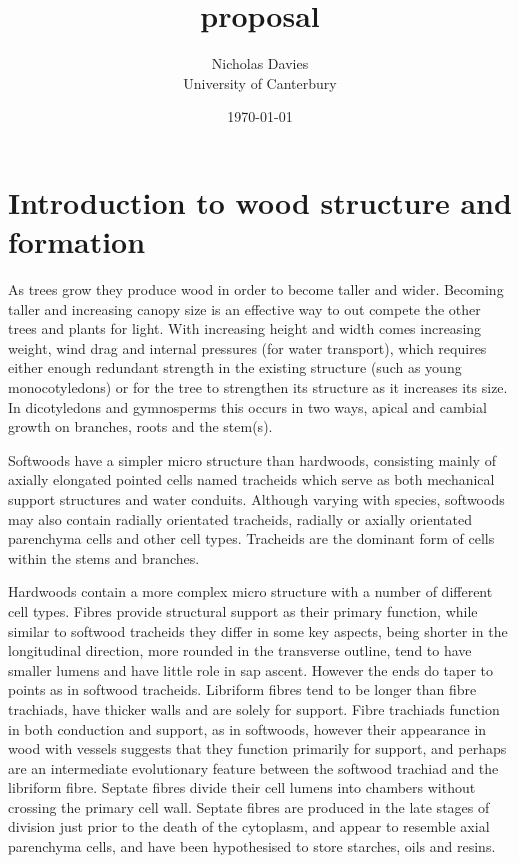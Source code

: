 \documentclass{article}
\begin{document}
\title{proposal}

\author{Nicholas Davies\\ University of Canterbury }

\date{\today}



\maketitle

\section{Introduction to wood structure and formation}
As trees grow they produce wood in order to become taller and wider. Becoming
taller and increasing canopy size is an effective way to out compete the other
trees and plants for light. With increasing height and width comes increasing
weight, wind drag and internal pressures (for water transport), which requires
either enough redundant strength in the existing structure (such as young monocotyledons) or
for the tree to strengthen its structure as it increases its size. In
dicotyledons and gymnosperms this occurs in two ways, apical and cambial growth
on branches, roots and the stem(s).

Softwoods have a simpler micro structure than hardwoods, consisting mainly of
axially elongated pointed cells named tracheids which serve as both mechanical
support structures and water conduits. Although varying with species, softwoods
may also contain radially orientated tracheids, radially or axially orientated
parenchyma cells and other cell types. Tracheids are the dominant form of cells
within the stems and branches.

Hardwoods contain a more complex micro structure with a number
of different cell types. Fibres provide structural support as their primary
function, while similar to softwood tracheids they differ in some key aspects,
being shorter in the longitudinal direction, more rounded in the transverse
outline, tend to have smaller lumens and have little role in sap ascent. However
the ends do taper to points as in softwood tracheids. Libriform fibres tend to
be longer than fibre trachiads, have thicker walls and are solely for support.
Fibre trachiads function in both conduction and support, as in softwoods,
however their appearance in wood with vessels suggests that they function
primarily for support, and perhaps are an intermediate evolutionary feature
between the softwood trachiad and the libriform fibre. Septate fibres divide
their cell lumens into chambers without crossing the primary cell wall. Septate
fibres are produced in the late stages of division just prior to the death of
the cytoplasm, and appear to resemble axial parenchyma cells, and have been
hypothesised to store starches, oils and resins.
\end{document}
